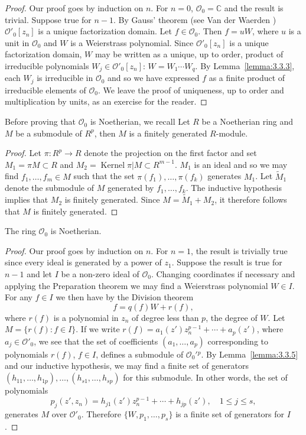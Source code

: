 \begin{proof}
Our proof goes by induction on $n$. For $n=0$, $\mathcal O_0=\mathbb C$ and the result is trivial. Suppose true for $n-1$. By Gauss' theorem (see Van der Waerden \cite[page 70]{bib:I:waerden-b-l-van-der:1}) $\mathcal O'_0[z_n]$ is a unique factorization domain. Let $f\in\mathcal O_0$. Then $f=uW$, where $u$ is a unit in $\mathcal O_0$ and $W$ is a Weierstrass polynomial. Since $\mathcal O'_0[z_n]$ is a unique factorization domain, $W$ may be written as a unique, up to order, product of irreducible polynomials $W_j\in\mathcal O'_0[z_n]$: $W=W_1\cdots W_q$. By Lemma~\ref{lemma:3.3.3}, each $W_j$ is irreducible in $\mathcal O_0$ and so we have expressed $f$ as a finite product of
irreducible elements of $\mathcal O_0$. We leave the proof of uniqueness, up to order and multiplication by units, as an exercise for the reader.
\end{proof}
Before proving that $\mathcal O_0$ is Noetherian, we recall
 Let $R$ be a Noetherian ring and $M$ be a submodule of $R^p$, then $M$ is a finitely generated $R$-module.
\begin{proof}
Let $\pi:R^p\to R$ denote the projection on the first factor and set $M_1=\pi M\subset R$ and $M_2=\operatorname{Kernel}\pi|M\subset R^{m-1}$. $M_1$ is an ideal and so we may find $f_1,\ldots,f_m\in M$ such that the set $\pi(f_1),\ldots,\pi(f_k)$ generates $M_1$. Let $\widetilde M_1$ denote the submodule of $M$ generated by $f_1,\ldots,f_k$. The inductive hypothesis implies that $M_2$ is finitely generated. Since $M=\widetilde M_1+M_2$, it therefore follows that $M$ is finitely generated.
\end{proof}
 The ring $\mathcal O_0$ is Noetherian.
\begin{proof}
Our proof goes by induction on $n$. For $n=1$, the result is trivially true since every ideal is generated by a power of $z_1$. Suppose the result is true for $n-1$ and let $I$ be a non-zero ideal of $\mathcal O_0$. Changing coordinates if necessary and applying the Preparation theorem we may find a Weierstrass polynomial $W\in I$. For any $f\in I$ we then have by the Division theorem
\[f=q(f)W+r(f),\]
where $r(f)$ is a polynomial in $z_n$ of degree less than $p$, the degree of $W$. Let $M=\{r(f):f\in I\}$. If we write $r(f)=a_1(z')z_n^{p-1}+\cdots+a_p(z')$, where $a_j\in\mathcal O'_0$, we see that the set of coefficients $(a_1,\ldots,a_p)$ corresponding to polynomials $r(f)$, $f\in I$, defines a submodule of $\mathcal O_0'{}^p$. By Lemma~\ref{lemma:3.3.5} and our inductive hypothesis, we may find a finite set of generators $(h_{11},\ldots,h_{1p}),\ldots,(h_{s1},\ldots,h_{sp})$ for this submodule. In other words, the set of polynomials
\[p_j(z',z_n)=h_{j1}(z')z_n^{p-1}+\cdots+h_{jp}(z'),\quad1\leq j\leq s,\]
generates $M$ over $\mathcal O'_0$. Therefore $\{W,p_1,\ldots,p_s\}$ is a finite set of generators for $I$.
\end{proof}
